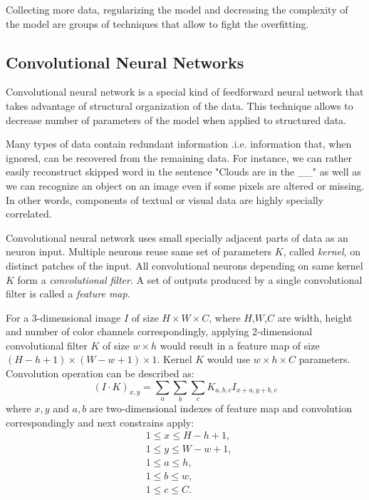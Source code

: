 Collecting more data, regularizing the model and decreasing the complexity of the model are groups of techniques that allow to fight the overfitting.




\subsection{Convolutional Neural Networks}
\label{ch:cnn}

Convolutional neural network is a special kind of feedforward neural network that takes advantage of structural organization of the data. This technique allows to decrease number of parameters of the model when applied to structured data.

Many types of data contain redundant information .i.e. information that, when ignored, can be recovered from the remaining data.
For instance, we can rather easily reconstruct skipped word in the sentence "Clouds are in the \_\_" as well as we can recognize an object on an image even if some pixels are altered or missing.
In other words, components of textual or visual data are highly specially correlated.

Convolutional neural network uses small specially adjacent parts of data as an neuron input. Multiple neurons reuse same set of parameters $K$, called \textit{kernel}, on distinct patches of the input. All convolutional neurons depending on same kernel $K$ form a \textit{convolutional filter}. A set of outputs produced by a single convolutional filter is called a \textit{feature map}.



For a 3-dimensional image $I$ of size $H \times W \times C$, where $H$,$W$,$C$ are width, height and number of color channels correspondingly, applying 2-dimensional convolutional filter $K$ of size $w \times h$ would result in a feature map of size $(H-h+1) \times (W-w+1) \times 1$. Kernel $K$ would use $w \times h \times C$ parameters. Convolution operation can be described as:
\begin{equation}\label{eq:conv}
  (I \cdot K)_{x, y} = \sum_a \sum_b \sum_c K_{a,b,c} I_{x+a, y+b,c}
\end{equation}
where ${x, y}$ and ${a,b}$ are two-dimensional indexes of feature map and convolution correspondingly and next constrains apply:
\begin{equation*}
  \begin{aligned}
  &1 \leq  x \leq H-h+1, \\
  &1 \leq  y \leq W-w+1, \\
  &1 \leq  a \leq h, \\
  &1 \leq  b \leq w, \\
  &1 \leq  c \leq C.
\end{aligned}
\end{equation*}

